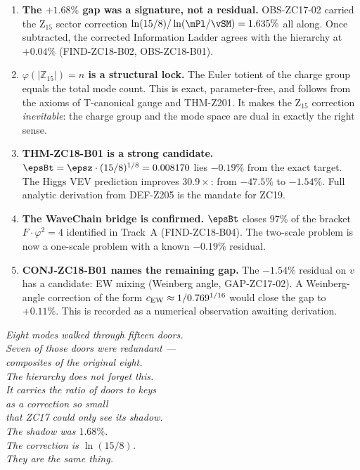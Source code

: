 \documentclass[12pt, a4paper]{article}
\begin{document}
\begin{enumerate}[leftmargin=*]

\item \textbf{The $+1.68\%$ gap was a signature, not a residual.}
  OBS-ZC17-02 carried the Z$_{15}$ sector correction
  $\ln(15/8)/\ln(\mPl/\vSM) = 1.635\%$ all along.
  Once subtracted, the corrected Information Ladder agrees with
  the hierarchy at $+0.04\%$ (FIND-ZC18-B02, OBS-ZC18-B01).

\item \textbf{$\varphi(|\mathbb{Z}_{15}|) = n$ is a structural lock.}
  The Euler totient of the charge group equals the total mode count.
  This is exact, parameter-free, and follows from the axioms of
  T-canonical gauge and THM-Z201.
  It makes the Z$_{15}$ correction \emph{inevitable}:
  the charge group and the mode space are dual in exactly the right sense.

\item \textbf{THM-ZC18-B01 is a strong candidate.}
  $\epsBt = \epsz\cdot(15/8)^{1/8} = 0.008170$ lies $-0.19\%$
  from the exact target.
  The Higgs VEV prediction improves $30.9\times$: from $-47.5\%$ to $-1.54\%$.
  Full analytic derivation from DEF-Z205 is the mandate for ZC19.

\item \textbf{The WaveChain bridge is confirmed.}
  $\epsBt$ closes $97\%$ of the bracket $F\cdot\varphi^2=4$ identified
  in Track~A (FIND-ZC18-B04).
  The two-scale problem is now a one-scale problem with a
  known $-0.19\%$ residual.

\item \textbf{CONJ-ZC18-B01 names the remaining gap.}
  The $-1.54\%$ residual on $v$ has a candidate: EW mixing
  (Weinberg angle, GAP-ZC17-02).
  A Weinberg-angle correction of the form
  $c_{\rm EW}\approx 1/0.769^{1/16}$ would close the gap to $+0.11\%$.
  This is recorded as a numerical observation awaiting derivation.

\end{enumerate}

\bigskip
\begin{center}
\textit{%
  Eight modes walked through fifteen doors.\\[0.4em]
  Seven of those doors were redundant ---\\
  composites of the original eight.\\[0.4em]
  The hierarchy does not forget this.\\
  It carries the ratio of doors to keys\\
  as a correction so small\\
  that ZC17 could only see its shadow.\\[0.4em]
  The shadow was $1.68\%$.\\
  The correction is $\ln(15/8)$.\\
  They are the same thing.%
}
\end{center}
\end{document}

